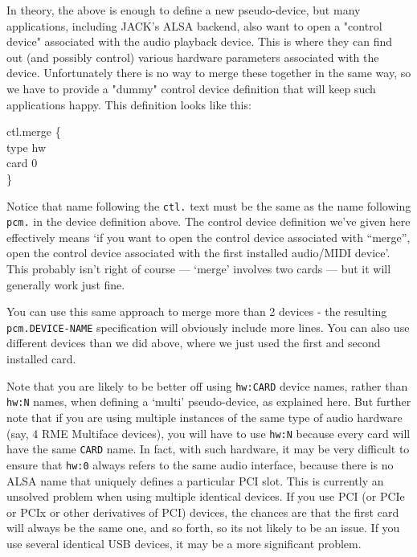 \documentclass[10pt,a4paper]{book}
\begin{document}
\begin{enumerate}
\begin{itemize}
In theory, the above is enough to define a new pseudo-device, but many
applications, including JACK's ALSA backend, also want to open a
"control device" associated with the audio playback device. This is
where they can find out (and possibly control) various hardware
parameters associated with the device. Unfortunately there is no way
to merge these together in the same way, so we have to provide a
"dummy" control device definition that will keep such applications
happy. This definition looks like this:

\begin{listing}
ctl.merge \{\\
    type hw\\
    card 0\\
\}
\end{listing}

Notice that name following the \texttt{ctl.} text must be the same as
the name following \texttt{pcm.} in the device definition above. The
control device definition we've given here effectively means `if you
want to open the control device associated with ``merge'', open the
control device associated with the first installed audio/MIDI
device'. This probably isn't right of course --- `merge' involves two
cards --- but it will generally work just fine.

You can use this same approach to merge more than 2 devices - the
resulting \texttt{pcm.DEVICE-NAME} specification will obviously
include more lines. You can also use different devices than we did
above, where we just used the first and second installed card.

Note that you are likely to be better off using \texttt{hw:CARD} device names,
rather than \texttt{hw:N} names, when defining a `multi' pseudo-device, as
explained here. But further note that if you are using multiple
instances of the same type of audio hardware (say, 4 RME Multiface
devices), you will have to use \texttt{hw:N} because every card will have the
same \texttt{CARD} name. In fact, with such hardware, it may be very
difficult to ensure that \texttt{hw:0} always refers to the same audio
interface, because there is no ALSA name that uniquely defines a
particular PCI slot. This is currently an unsolved problem when using
multiple identical devices. If you use PCI (or PCIe or PCIx or other
derivatives of PCI) devices, the chances are that the first card will
always be the same one, and so forth, so its not likely to be an
issue. If you use several identical USB devices, it may be a more
significant problem.


\end{itemize}
\end{enumerate}
\end{document}
